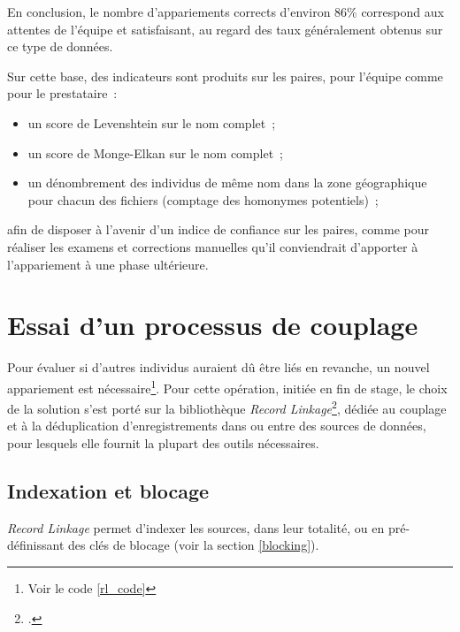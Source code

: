 \documentclass[a4paper,12pt,twoside]{book}
\begin{document}
    	        En conclusion, le nombre d'appariements corrects d'environ 86\% correspond aux attentes de l'équipe et satisfaisant, au regard des taux généralement obtenus sur ce type de données.
    	        
    	        Sur cette base, des indicateurs sont produits sur les paires, pour l'équipe comme pour le prestataire~:
    	        
    	        \begin{itemize}
	                \item un score de Levenshtein sur le nom complet~;
	                \item un score de Monge-Elkan sur le nom complet~;
	                \item un dénombrement des individus de même nom dans la zone géographique pour chacun des fichiers (comptage des homonymes potentiels)~;
	            \end{itemize}
	            \vspace{0.8em}
	            afin de disposer à l'avenir d'un indice de confiance sur les paires, comme pour réaliser les examens et corrections manuelles qu'il conviendrait d'apporter à l'appariement à une phase ultérieure.
	            
        \section{Essai d'un processus de couplage}
            \label{rl}
            
            Pour évaluer si d'autres individus auraient dû être liés en revanche, un nouvel appariement est nécessaire\footnote{Voir le code \ref{rl_code}}.
            Pour cette opération, initiée en fin de stage, le choix de la solution s'est porté sur la bibliothèque \textit{Record Linkage}\footcite[][Voir également~: \url{https://github.com/J535D165/recordlinkage} et \url{https://pypi.org/project/recordlinkage/}]{debruinPythonRecordLinkage2019}, dédiée au couplage et à la  déduplication d'enregistrements dans ou entre des sources de données, pour lesquels elle fournit la plupart des outils nécessaires.
            \pagebreak
	            
	       \subsection{Indexation et blocage}
	            
                \textit{Record Linkage} permet d'indexer les sources, dans leur totalité, ou en pré-définissant des clés de blocage (voir la section \ref{blocking}).
                
\end{document}
